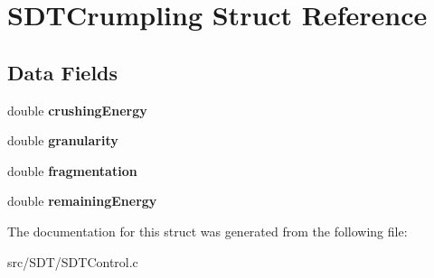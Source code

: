 \hypertarget{struct_s_d_t_crumpling}{}\section{S\+D\+T\+Crumpling Struct Reference}
\label{struct_s_d_t_crumpling}
\subsection*{Data Fields}
\begin{DoxyCompactItemize}
\item 
\hypertarget{struct_s_d_t_crumpling_ae441d9802546d10266b7b369f289a125}{}double {\bfseries crushing\+Energy}\label{struct_s_d_t_crumpling_ae441d9802546d10266b7b369f289a125}

\item 
\hypertarget{struct_s_d_t_crumpling_a5249a363398fde6b2e5b4be3c329ed06}{}double {\bfseries granularity}\label{struct_s_d_t_crumpling_a5249a363398fde6b2e5b4be3c329ed06}

\item 
\hypertarget{struct_s_d_t_crumpling_aed6775749daef6f8f92f61a8d4c8926d}{}double {\bfseries fragmentation}\label{struct_s_d_t_crumpling_aed6775749daef6f8f92f61a8d4c8926d}

\item 
\hypertarget{struct_s_d_t_crumpling_a33a504ea755732710823482be7a6614c}{}double {\bfseries remaining\+Energy}\label{struct_s_d_t_crumpling_a33a504ea755732710823482be7a6614c}

\end{DoxyCompactItemize}


The documentation for this struct was generated from the following file\+:\begin{DoxyCompactItemize}
\item 
src/\+S\+D\+T/S\+D\+T\+Control.\+c\end{DoxyCompactItemize}
